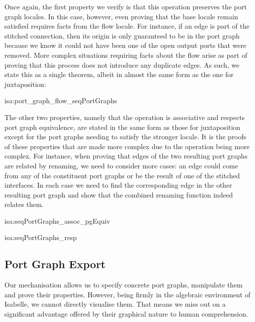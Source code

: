 \documentclass[class=smolathesis,crop=false]{standalone}
\begin{document}
Once again, the first property we verify is that this operation preserves the port graph locales.
In this case, however, even proving that the base locale remain satisfied requires facts from the flow locale.
For instance, if an edge is part of the stitched connection, then its origin is only guaranteed to be in the port graph because we know it could not have been one of the open output ports that were removed.
More complex situations requiring facts about the flow arise as part of proving that this process does not introduce any duplicate edges.
As such, we state this as a single theorem, albeit in almost the same form as the one for juxtaposition:
\begin{isalemma}{isa:port_graph_flow_seqPortGraphs}
  
\end{isalemma}

The other two properties, namely that the operation is associative and respects port graph equivalence, are stated in the same form as those for juxtaposition except for the port graphs needing to satisfy the stronger  locale.
It is the proofs of these properties that are made more complex due to the operation being more complex.
For instance, when proving that edges of the two resulting port graphs are related by renaming, we need to consider more cases: an edge could come from any of the constituent port graphs or be the result of one of the stitched interfaces.
In each case we need to find the corresponding edge in the other resulting port graph and show that the combined renaming function indeed relates them.
\begin{isalemma}{isa:seqPortGraphs_assoc_pgEquiv}
  
\end{isalemma}
\begin{isalemma}{isa:seqPortGraphs_resp}
  
\end{isalemma}

\subsection{Port Graph Export}
\label{sec:port_graphs/mech/export}

Our mechanisation allows us to specify concrete port graphs, manipulate them and prove their properties.
However, being firmly in the algebraic environment of Isabelle, we cannot directly visualise them.
That means we miss out on a significant advantage offered by their graphical nature to human comprehension.
\end{document}
